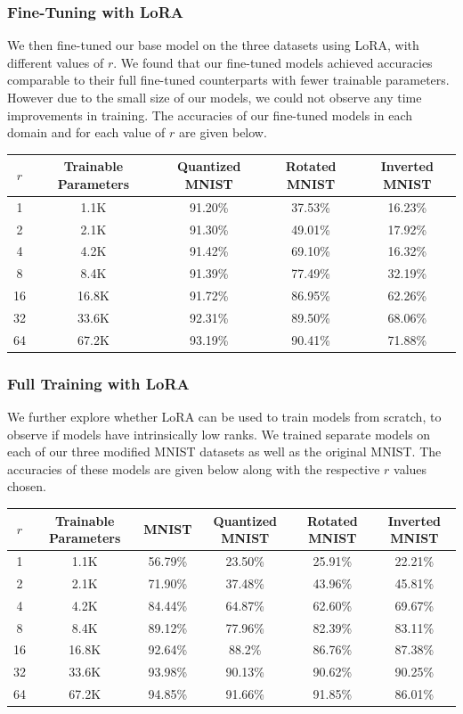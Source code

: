 \documentclass{article}
\newcommand\Tstrut{\rule{0pt}{2.6ex}}
\begin{document}
\subsubsection{Fine-Tuning with LoRA}
We then fine-tuned our base model on the three datasets using LoRA, with different values of $r$. We found that our fine-tuned models achieved accuracies comparable to their full fine-tuned counterparts with fewer trainable parameters. However due to the small size of our models, we could not observe any time improvements in training. The accuracies of our fine-tuned models in each domain and for each value of $r$ are given below.
\begin{center}
    \begin{tabular}{c | c | c | c | c}
        $r$ & Trainable Parameters & Quantized MNIST & Rotated MNIST & Inverted MNIST \\
        \hline
        1 & 1.1K & 91.20\% & 37.53\% & 16.23\% \Tstrut \\
        2 & 2.1K & 91.30\% & 49.01\% & 17.92\% \\
        4 & 4.2K & 91.42\% & 69.10\% & 16.32\% \\
        8 & 8.4K & 91.39\% & 77.49\% & 32.19\% \\
        16 & 16.8K & 91.72\% & 86.95\% & 62.26\% \\
        32 & 33.6K & 92.31\% & 89.50\% & 68.06\% \\
        64 & 67.2K & 93.19\% & 90.41\% & 71.88\%
    \end{tabular}
\end{center}
\subsubsection{Full Training with LoRA}
We further explore whether LoRA can be used to train models from scratch, to observe if models have intrinsically low ranks. We trained separate models on each of our three modified MNIST datasets as well as the original MNIST. The accuracies of these models are given below along with the respective $r$ values chosen.
\begin{center}
    \begin{tabular}{c | c | c | c | c | c}
        $r$ & Trainable Parameters & MNIST & Quantized MNIST & Rotated MNIST & Inverted MNIST \\
        \hline
        1 & 1.1K & 56.79\% & 23.50\% & 25.91\% & 22.21\% \Tstrut \\
        2 & 2.1K & 71.90\% & 37.48\% & 43.96\% & 45.81\% \\
        4 & 4.2K & 84.44\% & 64.87\% & 62.60\% & 69.67\% \\
        8 & 8.4K & 89.12\% & 77.96\% & 82.39\% & 83.11\% \\
        16 & 16.8K & 92.64\% & 88.2\% & 86.76\% & 87.38\% \\
        32 & 33.6K & 93.98\% & 90.13\% & 90.62\% & 90.25\% \\
        64 & 67.2K & 94.85\% & 91.66\% & 91.85\% & 86.01\%
    \end{tabular}
\end{center}
\end{document}
